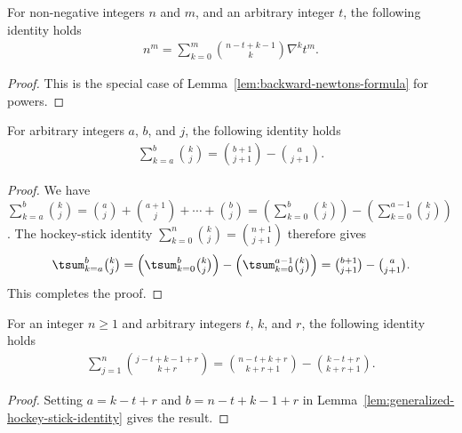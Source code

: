 \begin{lemma}
  \label{lem:backward-newtons-formula-for-powers}
  For non-negative integers $n$ and $m$, and an arbitrary integer $t$, the following identity holds
  \begin{align*}
    n^m = \sum_{k=0}^{m} \binom{n-t+k-1}{k} \nabla^{k} t^m.
  \end{align*}
  \begin{proof}
    This is the special case of Lemma~\eqref{lem:backward-newtons-formula} for powers.
  \end{proof}
\end{lemma}

\begin{lemma}
  \label{lem:generalized-hockey-stick-identity}
  For arbitrary integers $a$, $b$, and $j$, the following identity holds
  \begin{align*}
    \sum_{k=a}^{b} \binom{k}{j} = \binom{b+1}{j+1} - \binom{a}{j+1}.
  \end{align*}
  \begin{proof}
    We have
    $\sum_{k=a}^{b} \binom{k}{j}
    = \binom{a}{j} + \binom{a+1}{j} + \cdots + \binom{b}{j}
    = \left( \sum_{k=0}^{b} \binom{k}{j} \right) - \left( \sum_{k=0}^{a-1} \binom{k}{j} \right)$.
    The hockey-stick identity $\sum_{k=0}^{n} \binom{k}{j} = \binom{n+1}{j+1}$ therefore gives
    \begin{align*}
      \tsum_{k=a}^{b} \tbinom{k}{j}
      = \left( \tsum_{k=0}^{b} \tbinom{k}{j} \right) - \left( \tsum_{k=0}^{a-1} \tbinom{k}{j} \right)
      = \tbinom{b+1}{j+1} - \tbinom{a}{j+1}.
    \end{align*}
    This completes the proof.
  \end{proof}
\end{lemma}

\begin{lemma}
  \label{lem:backward-hockey-stick-identity}
  For an integer $n\geq1$ and arbitrary integers $t$, $k$, and $r$, the following identity holds
  \begin{align*}
    \sum_{j=1}^{n} \binom{j-t+k-1+r}{k+r}
    = \binom{n-t+k+r}{k+r+1} - \binom{k-t+r}{k+r+1}.
  \end{align*}
  \begin{proof}
    Setting $a=k-t+r$ and $b=n-t+k-1+r$ in
    Lemma~\eqref{lem:generalized-hockey-stick-identity} gives the result.
  \end{proof}
\end{lemma}

